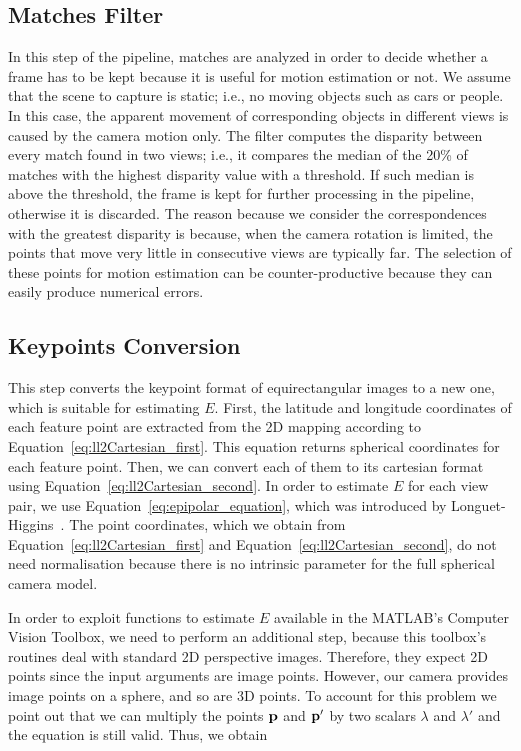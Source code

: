\subsection{Matches Filter}
In this step of the pipeline, matches are analyzed in order to decide 
whether a frame has to be kept because it is useful for motion estimation or
not.
%
We assume that the scene to capture is static; i.e., no moving objects such as cars or people. In this case, the apparent movement of corresponding objects in different views is caused by the camera motion only.
%
The filter computes the disparity between every match found in two views; i.e., 
it compares the median of the 20\% of matches with the highest 
disparity value with a threshold. If such median is above 
the threshold, the frame is kept for further processing in the pipeline, 
otherwise it is discarded.
%
The reason because we consider the correspondences with the greatest disparity is 
because, when the camera rotation is limited, the points that move very little 
in consecutive views are typically far. The selection of these points for motion 
estimation can be counter-productive because they can easily produce numerical 
errors. 

\subsection{Keypoints Conversion}
\label{sec:keypoints_conversion}
%
This step converts the keypoint format of equirectangular images to a new one, which is
suitable for estimating $E$.
%
First, the latitude and longitude coordinates of each feature point are 
extracted from the 2D mapping according to Equation~\ref{eq:ll2Cartesian_first}.
This equation returns spherical coordinates for each feature point. 
Then, we can convert each of them to its cartesian format using Equation~\ref{eq:ll2Cartesian_second}. 
%
In order to estimate $E$ for each view pair, we use Equation~\ref{eq:epipolar_equation}, which was
introduced by Longuet-Higgins~\cite{longuet1981computer}.
The point coordinates, which we obtain from Equation~\ref{eq:ll2Cartesian_first} and
Equation~\ref{eq:ll2Cartesian_second}, do not need normalisation because there
is no intrinsic parameter for the full spherical camera model.

In order to exploit functions to estimate $E$ available in the MATLAB's Computer Vision Toolbox, we need to perform an additional step, because this toolbox's routines deal with standard 2D perspective images. Therefore, they expect 
2D points since the input arguments are image points. However, our camera provides image points on a sphere, and so are 3D points. To account for this problem we point out that we can multiply the points $\mathbf{p}$ and $\mathbf{p}'$ by two 
scalars ${\lambda}$ and ${\lambda}'$ and the equation is still valid. Thus, we obtain

